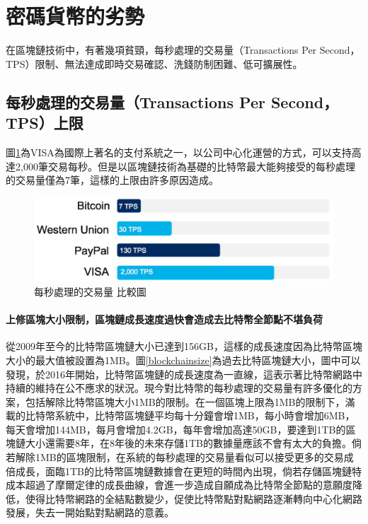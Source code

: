 	\section{密碼貨幣的劣勢}
	在區塊鏈技術中，有著幾項貧頸，每秒處理的交易量（Transactions Per Second，TPS）限制、無法達成即時交易確認、洗錢防制困難、低可擴展性。

		\subsection{每秒處理的交易量（Transactions Per Second，TPS）上限}
		圖\ref{TPS}為VISA為國際上著名的支付系統之一，以公司中心化運營的方式，可以支持高達2,000筆交易每秒。但是以區塊鏈技術為基礎的比特幣最大能夠接受的每秒處理的交易量僅為7筆，這樣的上限由許多原因造成。

			\begin{figure}[h]
				\centering
				\includegraphics[width = .7\textwidth]{TPS.png}
				\caption{每秒處理的交易量 比較圖\supercite{TPS}}\label{TPS}
			\end{figure}

			\paragraph{上修區塊大小限制，區塊鏈成長速度過快會造成去比特幣全節點不堪負荷}
			從2009年至今的比特幣區塊鏈大小已達到156GB，這樣的成長速度因為比特幣區塊大小的最大值被設置為1MB。圖\ref{blockchainsize}為過去比特區塊鏈大小，圖中可以發現，於2016年開始，比特幣區塊鏈的成長速度為一直線，這表示著比特幣網路中持續的維持在公不應求的狀況。現今對比特幣的每秒處理的交易量有許多優化的方案，包括解除比特幣區塊大小1MB的限制。在一個區塊上限為1MB的限制下，滿載的比特幣系統中，比特幣區塊鏈平均每十分鐘會增1MB，每小時會增加6MB，每天會增加144MB，每月會增加4.2GB，每年會增加高達50GB，要達到1TB的區塊鏈大小還需要8年，在8年後的未來存儲1TB的數據量應該不會有太大的負擔。倘若解除1MB的區塊限制，在系統的每秒處理的交易量看似可以接受更多的交易成倍成長，面臨1TB的比特幣區塊鏈數據會在更短的時間內出現，倘若存儲區塊鏈特成本超過了摩爾定律的成長曲線，會進一步造成自願成為比特幣全節點的意願度降低，使得比特幣網路的全結點數變少，促使比特幣點對點網路逐漸轉向中心化網路發展，失去一開始點對點網路的意義。

